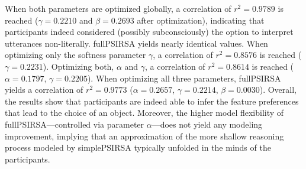 \documentclass[10pt,a4paper]{article}
\begin{document}
When both parameters are optimized globally, a correlation of $r^2 = 0.9789$ is reached
($\gamma=0.2210$ and $\beta=0.2693$ after optimization), indicating that participants indeed considered (possibly subconsciously) the option to interpret utterances non-literally. 
fullPSIRSA yields nearly identical values.
When optimizing only the softness parameter $\gamma$, a correlation of $r^2 = 0.8576$ is reached ($\gamma=0.2231$).
Optimizing both, $\alpha$ and $\gamma$, a correlation of $r^2 = 0.8614$ is reached ($\alpha=0.1797$, $\gamma=0.2205$).
When optimizing all three parameters, fullPSIRSA yields a correlation of $r^2 = 0.9773$ ($\alpha=0.2657$, $\gamma=0.2214$, $\beta=0.0030$).
Overall, the results show that participants are indeed able to infer the feature preferences that lead to the choice of an object.%
Moreover, the higher model flexibility of fullPSIRSA---controlled via parameter $\alpha$---does not yield any modeling improvement, implying that an approximation of the more shallow reasoning process modeled by simplePSIRSA typically unfolded in the minds of the participants.  

\end{document}
